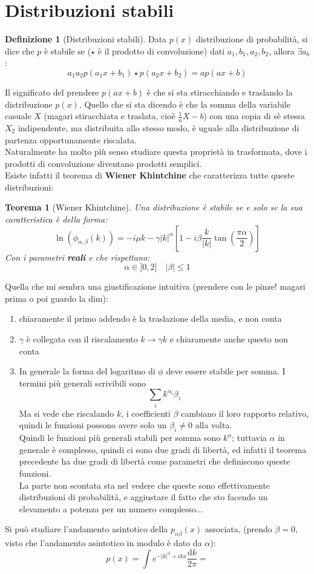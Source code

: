 \documentclass[a4paper,12pt]{article}
\theoremstyle{plain}
\newtheorem{thm}{Teorema}[section]
\theoremstyle{definition}
\newtheorem{defn}{Definizione}[section]
\newcommand{\f}[2]{\frac{#1}{#2}}
\renewcommand{\d}{\text{d}}
\newcommand{\ra}{\rightarrow}
\theoremstyle{remark}
\begin{document}
\section{Distribuzioni stabili}
\begin{defn}[Distribuzioni stabili]
Data $p(x)$ distribuzione di probabilità, si dice che $p$ è stabile se ($\star$ è il prodotto di convoluzione) dati $a_1,b_1,a_2,b_2$, allora $\exists a_b$:
\[a_1a_2p( a_1 x+ b_1) \star p( a_2x+b_2)={a}p(a x +b)		\]
\end{defn}
Il significato del prendere $p(a x+b)$ è che si sta stiracchiando e traslando la distribuzione $p(x)$. Quello che si sta dicendo è che la somma della variabile casuale $X$ (magari stiracchiata e traslata, cioè $\f{1}{a}X-b$) con una copia di sè stessa $X_2$ indipendente, ma distribuita allo stesso modo, è uguale alla distribuzione di partenza opportunamente riscalata.\\
Naturalmente ha molto più senso studiare questa proprietà in trasformata, dove i prodotti di convoluzione diventano prodotti semplici.
\\ Esiste infatti il teorema di \textbf{Wiener Khintchine} che caratterizza tutte queste distribuzioni:
\begin{thm}[Wiener Khintchine]
Una distribuzione è stabile se e solo se la sua caratteristica è della forma:
\[\ln(\phi_{\alpha,\beta}(k))=	-i\mu k	-\gamma |k|^\alpha\left[1-i\beta\f{k}{|k|}\tan(\f{\pi \alpha}{2})\right]	\]
Con i parametri \textbf{reali} e che rispettano:
\[\alpha\in ]0,2]	\quad |\beta|\le 1	\]
\end{thm}
Quella che mi sembra una giustificazione intuitiva (prendere con le pinze! magari prima o poi guardo la dim):
\begin{enumerate}
\item chiaramente il primo addendo è la traslazione della media, e non conta
\item $\gamma$ è collegata con il riscalamento $k\ra \gamma k$ e chiaramente anche questo non conta
\item  In generale la forma del logaritmo di $\phi$ deve essere stabile per somma. I termini più generali scrivibili sono
\[\sum_i k^{\alpha_i} \beta_i\]
Ma si vede che riscalando $k$, i coefficienti $\beta$ cambiano il loro rapporto relativo, quindi le funzioni possono avere solo un $\beta_i\ne 0$ alla volta.
\\Quindi le funzioni più generali stabili per somma sono $k^{\alpha}$; tuttavia $\alpha$ in generale è complesso, quindi ci sono due gradi di libertà, ed infatti il teorema precedente ha due gradi di libertà come parametri che definiscono queste funzioni.\\La parte non scontata sta nel vedere che queste sono effettivamente distribuzioni di probabilità, e aggiustare il fatto che sto facendo un elevamento a potenza per un numero complesso...
\end{enumerate}
Si può studiare l'andamento asintotico della $p_{\alpha\beta}(x)$ associata, (prendo $\beta=0$, visto che l'andamento asintotico in modulo è dato da $\alpha$):
\[p(x)=\int e^{-|k|^{\alpha}+ikx}	\f{\d k}{2 \pi}	=\]
\end{document}
